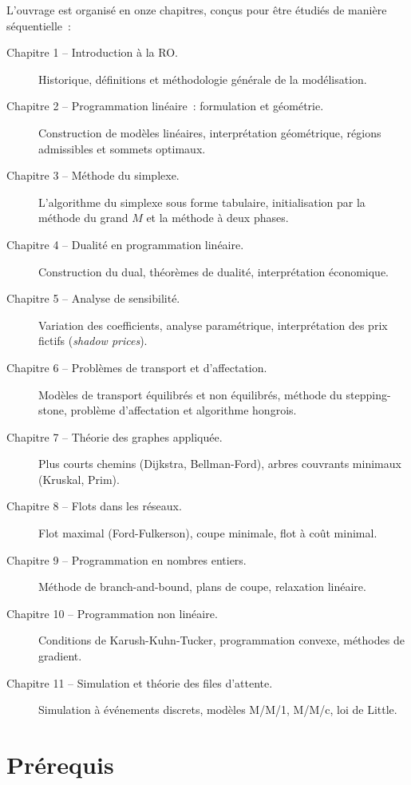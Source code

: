 L'ouvrage est organis\'e en onze chapitres, con\c{c}us pour \^etre \'etudi\'es de
mani\`ere s\'equentielle~:

\begin{description}
  \item[Chapitre 1 -- Introduction \`a la RO.]
    Historique, d\'efinitions et m\'ethodologie g\'en\'erale de la mod\'elisation.
  \item[Chapitre 2 -- Programmation lin\'eaire~: formulation et g\'eom\'etrie.]
    Construction de mod\`eles lin\'eaires, interpr\'etation g\'eom\'etrique, r\'egions
    admissibles et sommets optimaux.
  \item[Chapitre 3 -- M\'ethode du simplexe.]
    L'algorithme du simplexe sous forme tabulaire, initialisation par la
    m\'ethode du grand $M$ et la m\'ethode \`a deux phases.
  \item[Chapitre 4 -- Dualit\'e en programmation lin\'eaire.]
    Construction du dual, th\'eor\`emes de dualit\'e, interpr\'etation \'economique.
  \item[Chapitre 5 -- Analyse de sensibilit\'e.]
    Variation des coefficients, analyse param\'etrique, interpr\'etation des
    prix fictifs (\emph{shadow prices}).
  \item[Chapitre 6 -- Probl\`emes de transport et d'affectation.]
    Mod\`eles de transport \'equilibr\'es et non \'equilibr\'es, m\'ethode du
    stepping-stone, probl\`eme d'affectation et algorithme hongrois.
  \item[Chapitre 7 -- Th\'eorie des graphes appliqu\'ee.]
    Plus courts chemins (Dijkstra, Bellman-Ford), arbres couvrants minimaux
    (Kruskal, Prim).
  \item[Chapitre 8 -- Flots dans les r\'eseaux.]
    Flot maximal (Ford-Fulkerson), coupe minimale, flot \`a co\^ut minimal.
  \item[Chapitre 9 -- Programmation en nombres entiers.]
    M\'ethode de branch-and-bound, plans de coupe, relaxation lin\'eaire.
  \item[Chapitre 10 -- Programmation non lin\'eaire.]
    Conditions de Karush-Kuhn-Tucker, programmation convexe, m\'ethodes de
    gradient.
  \item[Chapitre 11 -- Simulation et th\'eorie des files d'attente.]
    Simulation \`a \'ev\'enements discrets, mod\`eles M/M/1, M/M/c, loi de Little.
\end{description}

\section*{Pr\'erequis}

